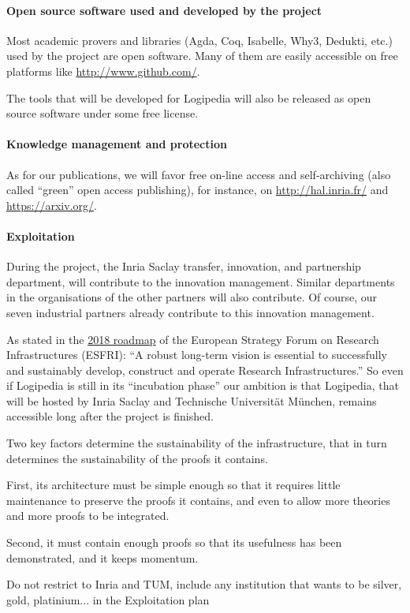 \paragraph*{Open source software used and developed by the project}

Most academic provers and libraries (Agda, Coq, Isabelle, Why3,
Dedukti, etc.) used by the project are open software. Many of them are
easily accessible on free platforms like \url{http://www.github.com/}.

The tools that will be developed for Logipedia will also be released
as open source software under some free license.

\paragraph*{Knowledge management and protection}

As for our publications, we will favor free on-line access and
self-archiving (also called ``green'' open access publishing), for
instance, on \url{http://hal.inria.fr/} and \url{https://arxiv.org/}.

\paragraph*{Exploitation}

During the project, the Inria Saclay transfer, innovation, and
partnership department, will contribute to the innovation management.
Similar departments in the organisations  of the other partners will 
also contribute. Of course, our seven industrial partners already 
contribute to this innovation management.

As stated in the \href{http://roadmap2018.esfri.eu/media/1048/rm2018-part1-20.pdf}{2018 roadmap} of the
European Strategy Forum on Research Infrastructures (ESFRI): ``A robust
long-term vision is essential to successfully and sustainably develop,
construct and operate Research Infrastructures.'' So even if
Logipedia is still in its ``incubation phase'' our ambition is that
Logipedia, that will be hosted by Inria Saclay and Technische
Universität München, remains accessible long after the project is
finished.

Two key factors determine the sustainability of the infrastructure,
that in turn determines the sustainability of the proofs it contains.
\begin{compactitem}
\item First, its architecture must be simple enough so that it requires
  little maintenance to preserve the proofs it contains, and even to
  allow more theories and more proofs to be integrated.
\item Second, it must contain enough proofs so that its usefulness has been
  demonstrated, and it keeps momentum. 

  {\color{red} Do not restrict to Inria and TUM, include any institution that wants to be
  silver, gold, platinium... in the Exploitation plan}
\end{compactitem}

